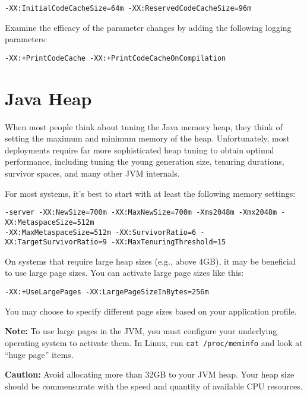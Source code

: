 \begin{verbatim}
-XX:InitialCodeCacheSize=64m -XX:ReservedCodeCacheSize=96m
\end{verbatim}

Examine the efficacy of the parameter changes by adding the following
logging parameters:

\begin{verbatim}
-XX:+PrintCodeCache -XX:+PrintCodeCacheOnCompilation
\end{verbatim}

\section{Java Heap}\label{java-heap}

When most people think about tuning the Java memory heap, they think of
setting the maximum and minimum memory of the heap. Unfortunately, most
deployments require far more sophisticated heap tuning to obtain optimal
performance, including tuning the young generation size, tenuring
durations, survivor spaces, and many other JVM internals.

For most systems, it's best to start with at least the following memory
settings:

\begin{verbatim}
-server -XX:NewSize=700m -XX:MaxNewSize=700m -Xms2048m -Xmx2048m -XX:MetaspaceSize=512m
-XX:MaxMetaspaceSize=512m -XX:SurvivorRatio=6 -XX:TargetSurvivorRatio=9 -XX:MaxTenuringThreshold=15
\end{verbatim}

On systems that require large heap sizes (e.g., above 4GB), it may be
beneficial to use large page sizes. You can activate large page sizes
like this:

\begin{verbatim}
-XX:+UseLargePages -XX:LargePageSizeInBytes=256m
\end{verbatim}

You may choose to specify different page sizes based on your application
profile.

\textbf{Note:} To use large pages in the JVM, you must configure your
underlying operating system to activate them. In Linux, run
\texttt{cat\ /proc/meminfo} and look at ``huge page'' items.

\noindent\hrulefill

\textbf{Caution:} Avoid allocating more than 32GB to your JVM heap. Your
heap size should be commensurate with the speed and quantity of
available CPU resources.

